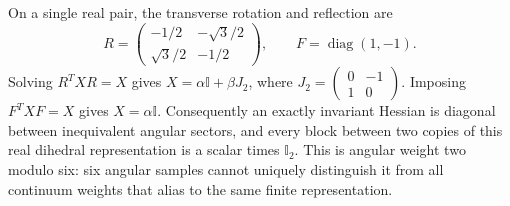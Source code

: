 \documentclass[11pt]{article}
\theoremstyle{remark}\newtheorem{remark}[theorem]{Remark}
\DeclareMathOperator{\diag}{diag}
\newcommand{\Id}{\mathbb I}
\begin{document}
On a single real pair, the transverse rotation and reflection are
\begin{equation}
R=\begin{pmatrix}-1/2&-\sqrt3/2\\\sqrt3/2&-1/2\end{pmatrix},
\qquad F=\diag(1,-1).
\label{eq:representation}
\end{equation}
Solving $R^TXR=X$ gives $X=\alpha\Id+\beta J_2$, where
$J_2=\left(\begin{smallmatrix}0&-1\\1&0\end{smallmatrix}\right)$.
Imposing $F^TXF=X$ gives $X=\alpha\Id$.
Consequently an exactly invariant Hessian is diagonal between inequivalent angular sectors, and every block between two copies of this real dihedral representation is a scalar times $\Id_2$.
This is angular weight two modulo six: six angular samples cannot uniquely distinguish it from all continuum weights that alias to the same finite representation.
\end{document}
